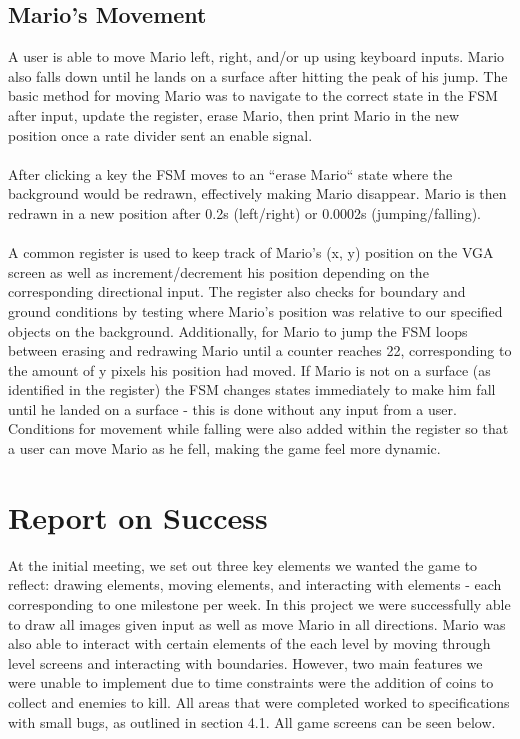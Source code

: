 \documentclass[12pt]{article}
\begin{document}
\subsection{Mario's Movement}
A user is able to move Mario left, right, and/or up using keyboard inputs. Mario also falls down until he lands on a surface after hitting the peak of his jump. The basic method for moving Mario was to navigate to the correct state in the FSM after input, update the register, erase Mario, then print Mario in the new position once a rate divider sent an enable signal.\\
\\After clicking a key the FSM moves to an ``erase Mario`` state where the background would be redrawn, effectively making Mario disappear. Mario is then redrawn in a new position after 0.2s (left/right) or 0.0002s (jumping/falling). \\
\\A common register is used to keep track of Mario's (x, y) position on the VGA screen as well as increment/decrement his position depending on the corresponding directional input. The register also checks for boundary and ground conditions by testing where Mario's position was relative to our specified objects on the background. Additionally, for Mario to jump the FSM loops between erasing and redrawing Mario until a counter reaches 22, corresponding to the amount of y pixels his position had moved. If Mario is not on a surface (as identified in the register) the FSM changes states immediately to make him fall until he landed on a surface - this is done without any input from a user. Conditions for movement while falling were also added within the register so that a user can move Mario as he fell, making the game feel more dynamic. 

\section{Report on Success}
At the initial meeting, we set out three key elements we wanted the game to reflect: drawing elements, moving elements, and interacting with elements - each corresponding to one milestone per week. In this project we were successfully able to draw all images given input as well as move Mario in all directions. Mario was also able to interact with certain elements of the each level by moving through level screens and interacting with boundaries. However, two main features we were unable to implement due to time constraints were the addition of coins to collect and enemies to kill. All areas that were completed worked to specifications with small bugs, as outlined in section 4.1. All game screens can be seen below. \\
\end{document}
